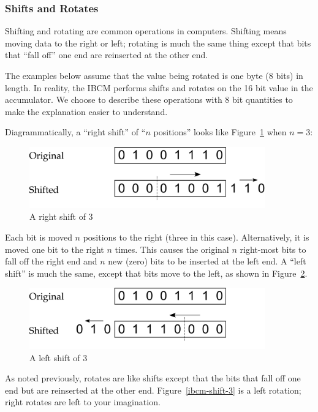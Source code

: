 \subsubsection{Shifts and Rotates}

Shifting and rotating are common operations in computers. Shifting
means moving data to the right or left; rotating is much the same
thing except that bits that ``fall off'' one end are reinserted at the
other end.  

The examples below assume that the value being rotated is one byte (8
bits) in length. In reality, the IBCM performs shifts and rotates on
the 16 bit value in the accumulator.  We choose to describe these
operations with 8 bit quantities to make the explanation easier to
understand.

Diagrammatically, a ``right shift'' of ``$n$ positions'' looks like
Figure~\ref{ibcm-shift-1} when $n = 3$:

\begin{figure}[h]
\centering
\includegraphics[width=4in]{ibcm/ibcm-shift-1.pdf}
\caption{A right shift of 3}
\label{ibcm-shift-1}
\end{figure}

Each bit is moved $n$ positions to the right (three in this case).
Alternatively, it is moved one bit to the right $n$ times. This causes
the original $n$ right-most bits to fall off the right end and $n$ new
(zero) bits to be inserted at the left end. A ``left shift'' is much
the same, except that bits move to the left, as shown in
Figure~\ref{ibcm-shift-2}.

\begin{figure}[h]
\centering
\includegraphics[width=4in]{ibcm/ibcm-shift-2.pdf}
\caption{A left shift of 3}
\label{ibcm-shift-2}
\end{figure}

As noted previously, rotates are like shifts except that the bits that
fall off one end but are reinserted at the other end.
Figure~\ref{ibcm-shift-3} is a left rotation; right rotates are left
to your imagination.

